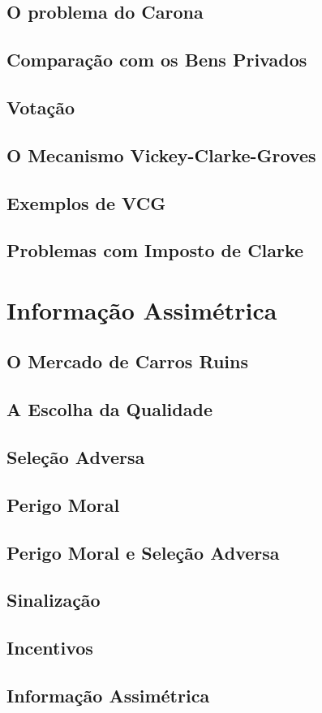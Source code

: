 \documentclass[a4paper,11pt,oneside]{book}
\theoremstyle{definition}
\theoremstyle{break}
\begin{document}
\section{O problema do Carona}
\section{Comparação com os Bens Privados}
\section{Votação}
\section{O Mecanismo Vickey-Clarke-Groves}
\section{Exemplos de VCG}
\section{Problemas com Imposto de Clarke}

\chapter{Informação Assimétrica}

\section{O Mercado de Carros Ruins}
\section{A Escolha da Qualidade}
\section{Seleção Adversa}
\section{Perigo Moral}
\section{Perigo Moral e Seleção Adversa}
\section{Sinalização}
\section{Incentivos}
\section{Informação Assimétrica}
\end{document}
